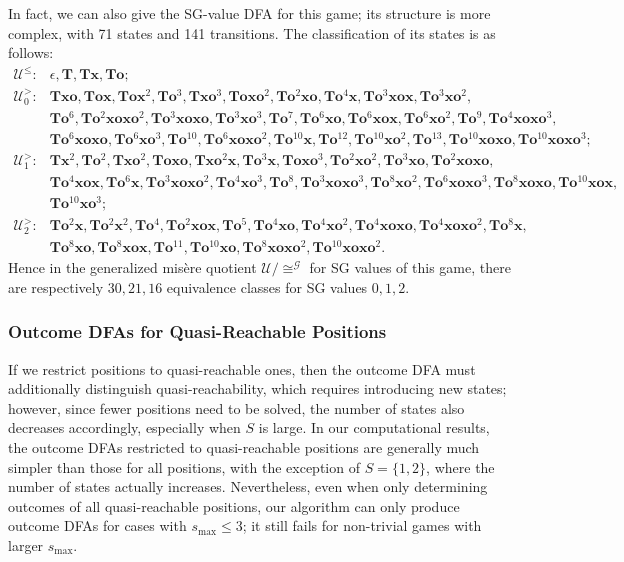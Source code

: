 \documentclass[11pt]{article}
\theoremstyle{definition}
\theoremstyle{plain}
\newcommand{\x}{\mathbf{x}}
\newcommand{\e}{\mathbf{o}}
\newcommand{\m}{\mathbf{T}}
\newcommand{\varG}{\mathcal{G}}
\newcommand{\varU}{\mathcal{U}}
\begin{document}
In fact, we can also give the SG-value DFA for this game; its structure is more complex, with 71 states and 141 transitions.
The classification of its states is as follows:
\tiny
\begin{align*}
    \varU^{\leq}: & \epsilon, \m, \m\x, \m\e; \\
    \varU^>_0:    & \m\x\e, \m\e\x, \m\e\x^2, \m\e^3, \m\x\e^3, \m\e\x\e^2, \m\e^2\x\e, \m\e^4\x, \m\e^3\x\e\x, \m\e^3\x\e^2, \\
                  & \m\e^6, \m\e^2\x\e\x\e^2, \m\e^3\x\e\x\e, \m\e^3\x\e^3, \m\e^7, \m\e^6\x\e, \m\e^6\x\e\x, \m\e^6\x\e^2, \m\e^9, \m\e^4\x\e\x\e^3, \\
                  & \m\e^6\x\e\x\e, \m\e^6\x\e^3, \m\e^{10}, \m\e^6\x\e\x\e^2, \m\e^{10}\x, \m\e^{12}, \m\e^{10}\x\e^2, \m\e^{13}, \m\e^{10}\x\e\x\e, \m\e^{10}\x\e\x\e^3; \\
    \varU^>_1:    & \m\x^2, \m\e^2, \m\x\e^2, \m\e\x\e, \m\x\e^2\x, \m\e^3\x, \m\e\x\e^3, \m\e^2\x\e^2, \m\e^3\x\e, \m\e^2\x\e\x\e, \\
                  & \m\e^4\x\e\x, \m\e^6\x, \m\e^3\x\e\x\e^2, \m\e^4\x\e^3, \m\e^8, \m\e^3\x\e\x\e^3, \m\e^8\x\e^2, \m\e^6\x\e\x\e^3, \m\e^8\x\e\x\e, \m\e^{10}\x\e\x, \\
                  & \m\e^{10}\x\e^3; \\
    \varU^>_2:    & \m\e^2\x, \m\e^2\x^2, \m\e^4, \m\e^2\x\e\x, \m\e^5, \m\e^4\x\e, \m\e^4\x\e^2, \m\e^4\x\e\x\e, \m\e^4\x\e\x\e^2, \m\e^8\x, \\
                  & \m\e^8\x\e, \m\e^8\x\e\x, \m\e^{11}, \m\e^{10}\x\e, \m\e^8\x\e\x\e^2, \m\e^{10}\x\e\x\e^2.
\end{align*}\normalsize
Hence in the generalized misère quotient $\varU/\cong^{\varG}$ for SG values of this game, there are respectively $30, 21, 16$ equivalence classes for SG values $0, 1, 2$.

\subsubsection{Outcome DFAs for Quasi-Reachable Positions}

If we restrict positions to quasi-reachable ones, then the outcome DFA must additionally distinguish quasi-reachability, which requires introducing new states;
however, since fewer positions need to be solved, the number of states also decreases accordingly, especially when $S$ is large.
In our computational results, the outcome DFAs restricted to quasi-reachable positions are generally much simpler than those for all positions, with the exception of $S=\{1, 2\}$, where the number of states actually increases.
Nevertheless, even when only determining outcomes of all quasi-reachable positions, our algorithm can only produce outcome DFAs for cases with $s_{\max}\leq 3$; it still fails for non-trivial games with larger $s_{\max}$.
\end{document}

